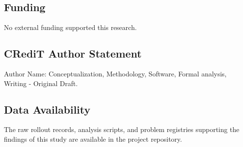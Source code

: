 \documentclass[11pt,3p,review]{elsarticle}
\begin{document}
\subsection{Funding}
No external funding supported this research.

\subsection{CRediT Author Statement}
Author Name: Conceptualization, Methodology, Software, Formal analysis, Writing - Original Draft.

\subsection{Data Availability}
The raw rollout records, analysis scripts, and problem registries supporting the findings of this study are available in the project repository.



\end{document}
